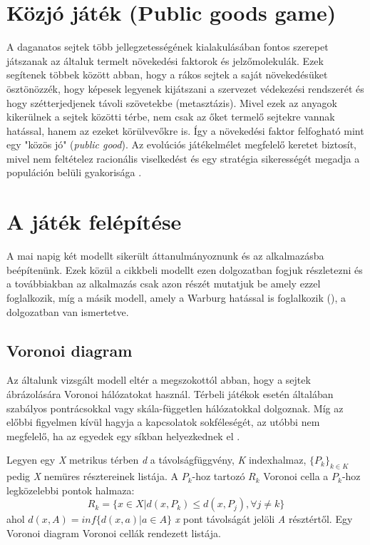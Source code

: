 \section{Közjó játék (Public goods game)}
A daganatos sejtek több jellegzetességének kialakulásában fontos szerepet játszanak az általuk termelt növekedési faktorok és jelzőmolekulák. Ezek segítenek többek között abban, hogy a rákos sejtek a saját növekedésüket ösztönözzék, hogy képesek legyenek kijátszani a szervezet védekezési rendszerét és hogy szétterjedjenek távoli szövetekbe (metasztázis). Mivel ezek az anyagok kikerülnek a sejtek közötti térbe, nem csak az őket termelő sejtekre vannak hatással, hanem az ezeket körülvevőkre is. Így a növekedési faktor felfogható mint egy "közös jó" (\textit{public good}). Az evolúciós játékelmélet megfelelő keretet biztosít, mivel nem feltételez racionális viselkedést és egy stratégia sikerességét megadja a populáción belüli gyakorisága \cite{archetti2016cooperation}.

\section{A játék felépítése}

A mai napig két modellt sikerült áttanulmányoznunk és az alkalmazásba beépítenünk. Ezek közül a \cite{archetti2016cooperation} cikkbeli modellt ezen dolgozatban fogjuk részletezni és a továbbiakban az alkalmazás csak azon részét mutatjuk be amely ezzel foglalkozik, míg a másik modell, amely a Warburg hatással is foglalkozik (\cite{archetti2014evolutionary}), a \cite{reka2017ubb} dolgozatban van ismertetve. 

\subsection{Voronoi diagram}
Az általunk vizsgált modell eltér a megszokottól abban, hogy a sejtek ábrázolására Voronoi hálózatokat használ. Térbeli játékok esetén általában szabályos pontrácsokkal vagy skála-független hálózatokkal dolgoznak. Míg az előbbi figyelmen kívül hagyja a kapcsolatok sokféleségét, az utóbbi nem megfelelő, ha az egyedek egy síkban helyezkednek el \cite{archetti2016cooperation}.

Legyen egy \textit{X} metrikus térben \textit{d} a távolságfüggvény, \textit{K} indexhalmaz, \(\{P_k\}_{k \in K}\) pedig \textit{X} nemüres résztereinek listája. A \(P_k\)-hoz tartozó \(R_k\) Voronoi cella a \(P_k\)-hoz legközelebbi pontok halmaza: 
\begin{equation}
R_k = \{x \in X | d(x,P_k) \leq d(x,P_j), \forall j \neq k\}
\end{equation}
ahol \(d(x,A) = inf\{d(x,a)|a \in A\}\) \textit{x} pont távolságát jelöli \textit{A} résztértől. Egy Voronoi diagram Voronoi cellák rendezett listája.
  

